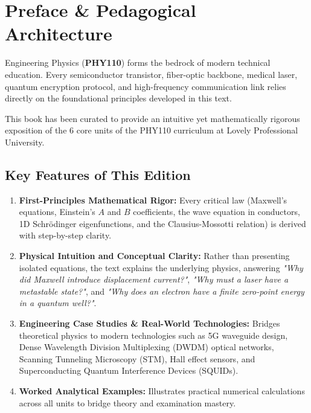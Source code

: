 \chapter*{Preface \& Pedagogical Architecture}

Engineering Physics (\textbf{PHY110}) forms the bedrock of modern technical education. Every semiconductor transistor, fiber-optic backbone, medical laser, quantum encryption protocol, and high-frequency communication link relies directly on the foundational principles developed in this text.

This book has been curated to provide an intuitive yet mathematically rigorous exposition of the 6 core units of the PHY110 curriculum at Lovely Professional University.

\section*{Key Features of This Edition}
\begin{enumerate}[leftmargin=*,itemsep=4pt]
    \item \textbf{First-Principles Mathematical Rigor:} Every critical law (Maxwell's equations, Einstein's $A$ and $B$ coefficients, the wave equation in conductors, 1D Schr\"odinger eigenfunctions, and the Clausius-Mossotti relation) is derived with step-by-step clarity.
    \item \textbf{Physical Intuition and Conceptual Clarity:} Rather than presenting isolated equations, the text explains the underlying physics, answering \textit{"Why did Maxwell introduce displacement current?"}, \textit{"Why must a laser have a metastable state?"}, and \textit{"Why does an electron have a finite zero-point energy in a quantum well?"}.
    \item \textbf{Engineering Case Studies \& Real-World Technologies:} Bridges theoretical physics to modern technologies such as 5G waveguide design, Dense Wavelength Division Multiplexing (DWDM) optical networks, Scanning Tunneling Microscopy (STM), Hall effect sensors, and Superconducting Quantum Interference Devices (SQUIDs).
    \item \textbf{Worked Analytical Examples:} Illustrates practical numerical calculations across all units to bridge theory and examination mastery.
\end{enumerate}
